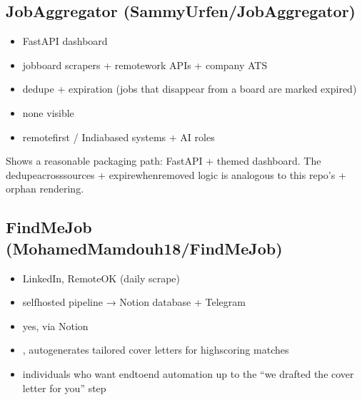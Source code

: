 \documentclass[a4paper,11pt,english]{sphinxmanual}
\begin{document}
\subsection{JobAggregator (SammyUrfen/JobAggregator)}
\label{\detokenize{analysis:jobaggregator-sammyurfen-jobaggregator}}\begin{itemize}
\item {} 
\sphinxAtStartPar
{} FastAPI dashboard

\item {} 
\sphinxAtStartPar
{} job\sphinxhyphen{}board scrapers + remote\sphinxhyphen{}work APIs + company ATS

\item {} 
\sphinxAtStartPar
{} dedupe + expiration (jobs that disappear from a
board are marked expired)

\item {} 
\sphinxAtStartPar
{} none visible

\item {} 
\sphinxAtStartPar
{} remote\sphinxhyphen{}first / India\sphinxhyphen{}based systems + AI roles

\end{itemize}

\sphinxAtStartPar
{} Shows a reasonable packaging path: FastAPI + themed
dashboard. The dedupe\sphinxhyphen{}across\sphinxhyphen{}sources + expire\sphinxhyphen{}when\sphinxhyphen{}removed logic is
analogous to this repo’s  + orphan rendering.


\subsection{Find\sphinxhyphen{}Me\sphinxhyphen{}Job (MohamedMamdouh18/Find\sphinxhyphen{}Me\sphinxhyphen{}Job)}
\label{\detokenize{analysis:find-me-job-mohamedmamdouh18-find-me-job}}\begin{itemize}
\item {} 
\sphinxAtStartPar
{} LinkedIn, RemoteOK (daily scrape)

\item {} 
\sphinxAtStartPar
{} self\sphinxhyphen{}hosted pipeline → Notion database + Telegram

\item {} 
\sphinxAtStartPar
{} yes, via Notion

\item {} 
\sphinxAtStartPar
{} , auto\sphinxhyphen{}generates
tailored cover letters for high\sphinxhyphen{}scoring matches

\item {} 
\sphinxAtStartPar
{} individuals who want end\sphinxhyphen{}to\sphinxhyphen{}end automation up to the
“we drafted the cover letter for you” step

\end{itemize}
\end{document}
